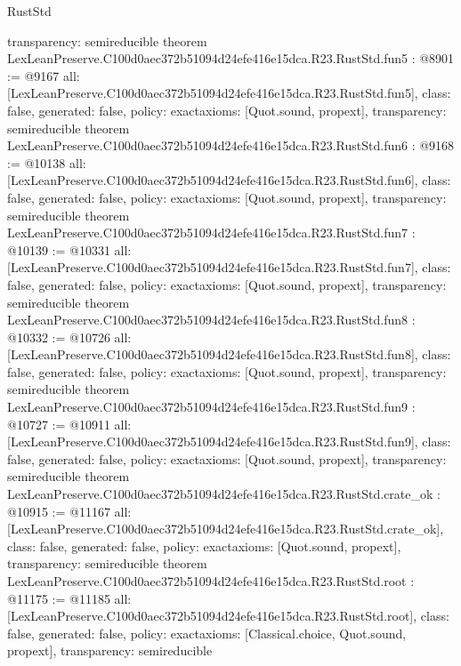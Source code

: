 \begin{lexlean}{RustStd}
\begin{coremodule}
{  transparency: semireducible
}
theorem LexLeanPreserve.C100d0aec372b51094d24efe416e15dca.R23.RustStd.fun5 : @8901 := @9167 {
  all: [LexLeanPreserve.C100d0aec372b51094d24efe416e15dca.R23.RustStd.fun5],
  class: false,
  generated: false,
  policy: exact{axioms: [Quot.sound, propext]},
  transparency: semireducible
}
theorem LexLeanPreserve.C100d0aec372b51094d24efe416e15dca.R23.RustStd.fun6 : @9168 := @10138 {
  all: [LexLeanPreserve.C100d0aec372b51094d24efe416e15dca.R23.RustStd.fun6],
  class: false,
  generated: false,
  policy: exact{axioms: [Quot.sound, propext]},
  transparency: semireducible
}
theorem LexLeanPreserve.C100d0aec372b51094d24efe416e15dca.R23.RustStd.fun7 : @10139 := @10331 {
  all: [LexLeanPreserve.C100d0aec372b51094d24efe416e15dca.R23.RustStd.fun7],
  class: false,
  generated: false,
  policy: exact{axioms: [Quot.sound, propext]},
  transparency: semireducible
}
theorem LexLeanPreserve.C100d0aec372b51094d24efe416e15dca.R23.RustStd.fun8 : @10332 := @10726 {
  all: [LexLeanPreserve.C100d0aec372b51094d24efe416e15dca.R23.RustStd.fun8],
  class: false,
  generated: false,
  policy: exact{axioms: [Quot.sound, propext]},
  transparency: semireducible
}
theorem LexLeanPreserve.C100d0aec372b51094d24efe416e15dca.R23.RustStd.fun9 : @10727 := @10911 {
  all: [LexLeanPreserve.C100d0aec372b51094d24efe416e15dca.R23.RustStd.fun9],
  class: false,
  generated: false,
  policy: exact{axioms: [Quot.sound, propext]},
  transparency: semireducible
}
theorem LexLeanPreserve.C100d0aec372b51094d24efe416e15dca.R23.RustStd.crate_ok : @10915 := @11167 {
  all: [LexLeanPreserve.C100d0aec372b51094d24efe416e15dca.R23.RustStd.crate_ok],
  class: false,
  generated: false,
  policy: exact{axioms: [Quot.sound, propext]},
  transparency: semireducible
}
theorem LexLeanPreserve.C100d0aec372b51094d24efe416e15dca.R23.RustStd.root : @11175 := @11185 {
  all: [LexLeanPreserve.C100d0aec372b51094d24efe416e15dca.R23.RustStd.root],
  class: false,
  generated: false,
  policy: exact{axioms: [Classical.choice, Quot.sound, propext]},
  transparency: semireducible
}


\end{coremodule}
\end{lexlean}
